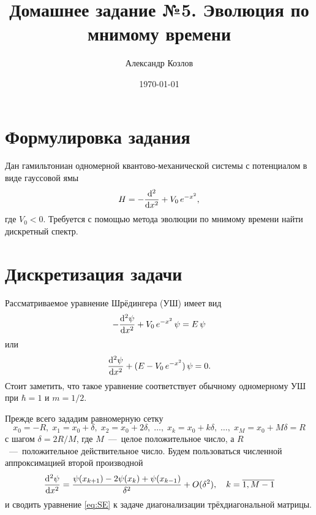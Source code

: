 \documentclass[11pt]{article}
\title{Домашнее задание №5. Эволюция по мнимому времени}
\author{Александр Козлов}
\date{\today}
\begin{document}
\maketitle

\section*{Формулировка задания}

Дан гамильтониан одномерной квантово-механической системы с потенциалом в виде гауссовой ямы
\begin{equation}
    H = - \dv[2]{}{x} + V_0\, e^{-x^2},
\end{equation}
где $V_0 < 0$. Требуется с помощью метода эволюции по мнимому времени найти дискретный спектр.

\section{Дискретизация задачи}

Рассматриваемое уравнение Шрёдингера (УШ) имеет вид
\begin{equation}
    -\dv[2]{\psi}{x} + V_0\, e^{-x^2}\, \psi  = E\, \psi
    \label{eq:SE}
\end{equation}
или
\begin{equation}
    \dv[2]{\psi}{x}  + (E - V_0\, e^{-x^2})\, \psi  = 0.
\end{equation}
Стоит заметить, что такое уравнение соответствует обычному одномерному УШ при $\hbar=1$ и $m=1/2$.

Прежде всего зададим равномерную сетку
\begin{equation}
    x_0 = -R,\; x_1 = x_0 + \delta,\; x_2 = x_0 + 2\delta,\; \ldots,\; x_k = x_0 + k\delta,\; \ldots,\; x_M = x_0 + M \delta = R
\end{equation}
с шагом $\delta = 2R/M$, где $M$~---~целое положительное число, а $R$~---~положительное действительное число. Будем пользоваться численной аппроксимацией второй производной
\begin{equation}
    \dv[2]{\psi}{x}(x_k) = \dfrac{\psi(x_{k+1}) - 2\psi(x_{k}) + \psi(x_{k-1})}{\delta^2} + O(\delta^2),\quad k = \overline{1,M-1}
\end{equation}
и сводить уравнение \eqref{eq:SE} к задаче диагонализации трёхдиагональной матрицы.
\end{document}
